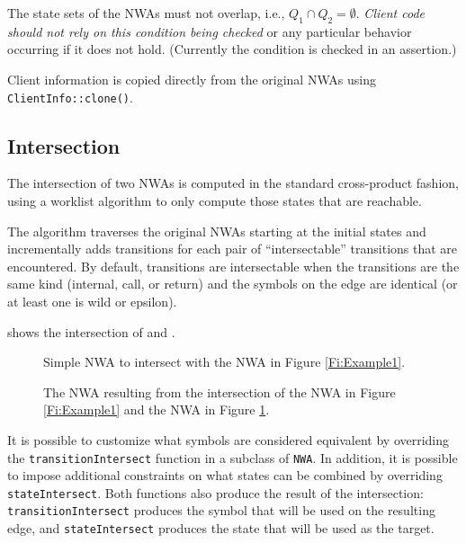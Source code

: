 The state sets of the NWAs must not overlap,
i.e., $Q_1 \cap Q_2 = \emptyset$. \textsl{Client code should not rely on
  this condition being checked} or any particular behavior occurring if it
does not hold. (Currently the condition is checked in an assertion.)

Client information is copied directly from the original NWAs using
\texttt{ClientInfo::clone()}.


\subsection{Intersection}
\label{Se:Intersection}

The intersection of two NWAs is computed in the standard cross-product
fashion, using a worklist algorithm to only compute those states that
are reachable.

The algorithm traverses the original NWAs starting at
the initial states and incrementally adds transitions for each pair of
``intersectable'' transitions that are encountered. By default, transitions
are intersectable when the transitions are the same kind (internal, call,
or return) and the symbols on the edge are identical (or at least one is wild
or epsilon).

 shows the intersection of  and
.
 
\begin{figure}[htbp]
  \centering
  \caption{Simple NWA to intersect with the NWA in Figure \ref{Fi:Example1}.}
  \label{Fi:Intersect1}
\end{figure}

\begin{figure}[htbp]
  \centering
  \caption{The NWA resulting from the intersection of the NWA in Figure
    \ref{Fi:Example1} and the NWA in Figure \ref{Fi:Intersect1}.}
  \label{Fi:Intersect2}
\end{figure}

It is possible to customize what symbols are considered equivalent by
overriding the \texttt{transitionIntersect} function in a subclass of
\texttt{NWA}. In addition, it is possible to impose additional constraints on
what states can be combined by overriding \texttt{stateIntersect}. Both
functions also produce the result of the intersection:
\texttt{transitionIntersect} produces the symbol that will be used on the
resulting edge, and \texttt{stateIntersect} produces the state that will be
used as the target.

